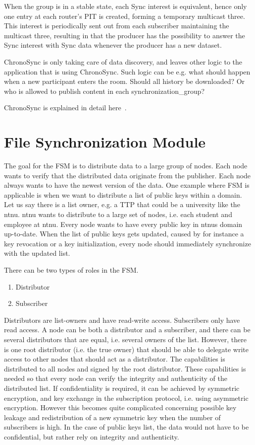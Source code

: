 When the group is in a stable state, each Sync \gls{interest} is equivalent, hence only one entry at each router's \gls{PIT} is created, forming a temporary multicast three.
This \gls{interest} is periodically sent out from each subscriber maintaining the multicast three, resulting in that the producer has the possibility to answer the Sync \gls{interest} with Sync \gls{data} whenever the producer has a new \gls{data}set.

ChronoSync is only taking care of \gls{data} discovery, and leaves other logic to the application that is using ChronoSync. 
Such logic can be e.g. what should happen when a new participant enters the room.
Should all history be downloaded? 
Or who is allowed to publish content in each \gls{synchronization_group}?

ChronoSync is explained in detail here~\cite{DBLP:conf/icnp/ZhuA13}.

\section{File Synchronization Module}\label{file-sync}
The goal for the \gls{FSM} is to distribute \gls{data} to a large group of nodes.
Each node wants to verify that the distributed \gls{data} originate from the \gls{publisher}.
Each node always wants to have the newest version of the \gls{data}. 
One example where \gls{FSM} is applicable is when we want to distribute a list of public keys within a domain.
Let us say there is a list owner, e.g. a \gls{TTP} that could be a university like the \gls{ntnu}.
\gls{ntnu} wants to distribute to a large set of nodes, i.e. each student and employee at \gls{ntnu}.
Every node wants to have every public key in \gls{ntnu}s domain up-to-date.
When the list of public keys gets updated, caused by for instance a key revocation or a key initialization, every node should immediately synchronize with the updated list.

There can be two types of roles in the \gls{FSM}. 
\begin{enumerate}
	\item Distributor
	\item Subscriber
\end{enumerate}
Distributors are list-owners and have read-write access.
Subscribers only have read access.
A node can be both a distributor and a subscriber, and there can be several distributors that are equal, i.e. several owners of the list.
However, there is one root distributor (i.e. the true owner) that should be able to delegate write access to other nodes that should act as a distributor. 
The capabilities is distributed to all nodes and signed by the root distributor.
These capabilities is needed so that every node can verify the integrity and authenticity of the distributed list.
If confidentiality is required, it can be achieved by symmetric encryption, and key exchange in the subscription protocol, i.e. using asymmetric encryption.
However this becomes quite complicated concerning possible key leakage and redistribution of a new symmetric key when the number of subscribers is high. 
In the case of public keys list, the \gls{data} would not have to be confidential, but rather rely on integrity and authenticity.

